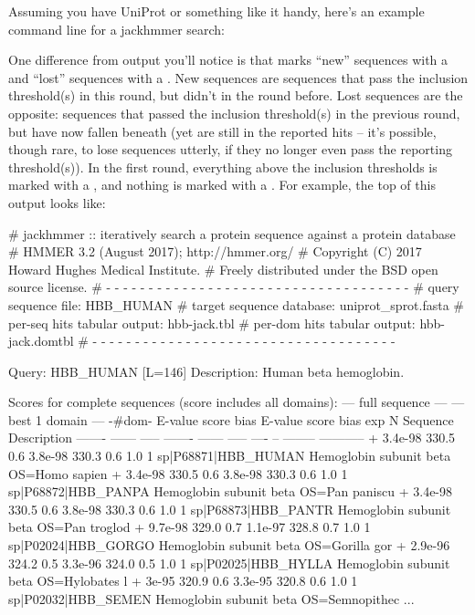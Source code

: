 Assuming you have UniProt or something like it handy, here's an
example command line for a jackhmmer search:


One difference from  output you'll notice is that
 marks ``new'' sequences with a \ccode{+} and ``lost''
sequences with a \ccode{-}. New sequences are sequences that pass the
inclusion threshold(s) in this round, but didn't in the round before.
Lost sequences are the opposite: sequences that passed the inclusion
threshold(s) in the previous round, but have now fallen beneath (yet
are still in the reported hits -- it's possible, though rare, to lose
sequences utterly, if they no longer even pass the reporting
threshold(s)).  In the first round, everything above the inclusion
thresholds is marked with a \ccode{+}, and nothing is marked with a
\ccode{-}. For example, the top of this output looks like:

\begin{samepage}
\begin{sreoutput}
# jackhmmer :: iteratively search a protein sequence against a protein database
# HMMER 3.2 (August 2017); http://hmmer.org/
# Copyright (C) 2017 Howard Hughes Medical Institute.
# Freely distributed under the BSD open source license.
# - - - - - - - - - - - - - - - - - - - - - - - - - - - - - - - - - - - -
# query sequence file:             HBB_HUMAN
# target sequence database:        uniprot_sprot.fasta
# per-seq hits tabular output:     hbb-jack.tbl
# per-dom hits tabular output:     hbb-jack.domtbl
# - - - - - - - - - - - - - - - - - - - - - - - - - - - - - - - - - - - -

Query:       HBB_HUMAN  [L=146]
Description: Human beta hemoglobin.

Scores for complete sequences (score includes all domains):
   --- full sequence ---   --- best 1 domain ---    -#dom-
    E-value  score  bias    E-value  score  bias    exp  N  Sequence              Description
    ------- ------ -----    ------- ------ -----   ---- --  --------              -----------
+   3.4e-98  330.5   0.6    3.8e-98  330.3   0.6    1.0  1  sp|P68871|HBB_HUMAN    Hemoglobin subunit beta OS=Homo sapien
+   3.4e-98  330.5   0.6    3.8e-98  330.3   0.6    1.0  1  sp|P68872|HBB_PANPA    Hemoglobin subunit beta OS=Pan paniscu
+   3.4e-98  330.5   0.6    3.8e-98  330.3   0.6    1.0  1  sp|P68873|HBB_PANTR    Hemoglobin subunit beta OS=Pan troglod
+   9.7e-98  329.0   0.7    1.1e-97  328.8   0.7    1.0  1  sp|P02024|HBB_GORGO    Hemoglobin subunit beta OS=Gorilla gor
+   2.9e-96  324.2   0.5    3.3e-96  324.0   0.5    1.0  1  sp|P02025|HBB_HYLLA    Hemoglobin subunit beta OS=Hylobates l
+     3e-95  320.9   0.6    3.3e-95  320.8   0.6    1.0  1  sp|P02032|HBB_SEMEN    Hemoglobin subunit beta OS=Semnopithec
...
\end{sreoutput}
\end{samepage}

